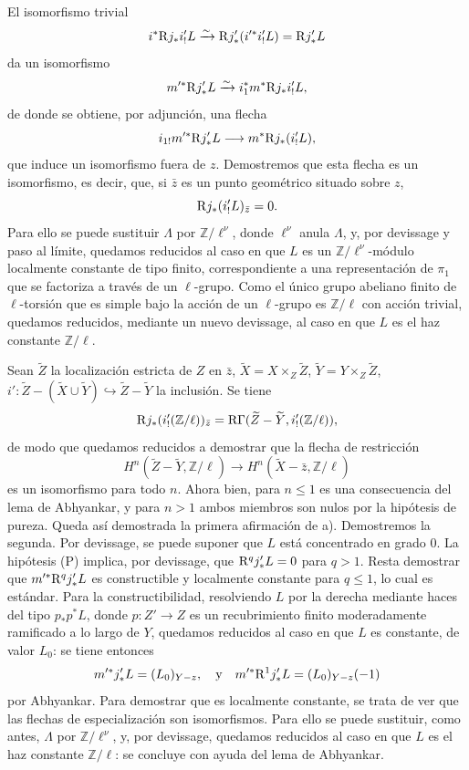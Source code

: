 El isomorfismo trivial
\[
i^*\mathrm{R} j_*i'_!L\xrightarrow{\sim}\mathrm{R} j'_*(i'^*i'_!L)=\mathrm{R} j'_*L
\]
da un isomorfismo
\[
m'^*\mathrm{R} j'_*L\xrightarrow{\sim} i_1^*m^*\mathrm{R} j_*i'_!L,
\]
de donde se obtiene, por adjunción, una flecha
\[
i_{1!}m'^*\mathrm{R} j'_*L\longrightarrow m^*\mathrm{R} j_*(i'_!L),
\]
que induce un isomorfismo fuera de $z$. Demostremos que esta flecha es un isomorfismo, es decir, que, si $\bar z$ es un punto geométrico situado sobre $z$,
\[
\mathrm{R} j_*(i'_!L)_{\bar z}=0.
\]
Para ello se puede sustituir $\Lambda$ por $\mathbb Z/\ell^\nu$, donde $\ell^\nu$ anula $\Lambda$, y, por devissage y paso al límite, quedamos reducidos al caso en que $L$ es un $\mathbb Z/\ell^\nu$-módulo localmente constante de tipo finito, correspondiente a una representación de $\pi_1$ que se factoriza a través de un $\ell$-grupo. Como el único grupo abeliano finito de $\ell$-torsión que es simple bajo la acción de un $\ell$-grupo es $\mathbb Z/\ell$ con acción trivial, quedamos reducidos, mediante un nuevo devissage, al caso en que $L$ es el haz constante $\mathbb Z/\ell$.

Sean $\widetilde Z$ la localización estricta de $Z$ en $\bar z$, $\widetilde X=X\times_Z\widetilde Z$, $\widetilde Y=Y\times_Z\widetilde Z$, $i':\widetilde Z-(\widetilde X\cup\widetilde Y)\hookrightarrow \widetilde Z-\widetilde Y$ la inclusión. Se tiene
\[
\mathrm{R} j_*(i'_!(\mathbb Z/\ell))_{\bar z}
=\mathrm{R}\Gamma(\widetilde Z-\widetilde Y,i'_!(\mathbb Z/\ell)),
\]
de modo que quedamos reducidos a demostrar que la flecha de restricción
\[
H^n(\widetilde Z-\widetilde Y,\mathbb Z/\ell)
\longrightarrow
H^n(\widetilde X-\bar z,\mathbb Z/\ell)
\]
es un isomorfismo para todo $n$. Ahora bien, para $n\le1$ es una consecuencia del lema de Abhyankar, y para $n>1$ ambos miembros son nulos por la hipótesis de pureza. Queda así demostrada la primera afirmación de a). Demostremos la segunda. Por devissage, se puede suponer que $L$ está concentrado en grado $0$. La hipótesis (P) implica, por devissage, que $\mathrm{R}^qj'_*L=0$ para $q>1$. Resta demostrar que $m'^*\mathrm{R}^qj'_*L$ es constructible y localmente constante para $q\le1$, lo cual es estándar. Para la constructibilidad, resolviendo $L$ por la derecha mediante haces del tipo $p_*p^*L$, donde $p:Z'\to Z$ es un recubrimiento finito moderadamente ramificado a lo largo de $Y$, quedamos reducidos al caso en que $L$ es constante, de valor $L_0$: se tiene entonces
\[
m'^*j'_*L=(L_0)_{Y-z},
\quad\text{y}\quad
m'^*\mathrm{R}^1j'_*L=(L_0)_{Y-z}(-1)
\]
por Abhyankar. Para demostrar que es localmente constante, se trata de ver que las flechas de especialización son isomorfismos. Para ello se puede sustituir, como antes, $\Lambda$ por $\mathbb Z/\ell^\nu$, y, por devissage, quedamos reducidos al caso en que $L$ es el haz constante $\mathbb Z/\ell$: se concluye con ayuda del lema de Abhyankar.
